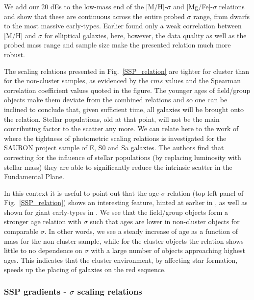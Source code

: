 \documentclass[useAMS,usenatbib]{mn2e}
\newcommand{\sig}{$\sigma$}
\begin{document}
We add our 20 dEs to the low-mass end of the [M/H]-{\sig} and [Mg/Fe]-{\sig} relations and show that these are continuous across the entire probed {\sig} range, from dwarfs to the most massive early-types. Earlier \cite{trager:2000} found only a weak correlation between [M/H] and {\sig} for elliptical galaxies, here, however, the data quality as well as the probed mass range and sample size make the presented relation much more robust.

The scaling relations presented in Fig.~\ref{SSP_relation} are tighter for cluster than for the non-cluster samples, as evidenced by the $rms$ values and the Spearman correlation coefficient values quoted in the figure. The younger ages of field/group objects make them deviate from the combined relations and so one can be inclined to conclude that, given sufficient time, all galaxies will be brought onto the relation. Stellar populations, old at that point, will not be the main contributing factor to the scatter any more. We can relate here to the work of \cite{falcon:2011b} where the tightness of photometric scaling relations is investigated for the SAURON project sample of E, S0 and Sa galaxies. The authors find that correcting for the influence of stellar populations (by replacing luminosity with stellar mass) they are able to significantly reduce the intrinsic scatter in the Fundamental Plane. 

In this context it is useful to point out that the age-{\sig} relation (top left panel of Fig.~\ref{SSP_relation}) shows an interesting feature, hinted at earlier in \cite{sanchezblazquez:2006a}, as well as shown for giant early-types in \cite{mcdermid:2015}. We see that the field/group objects form a stronger age relation with {\sig} such that ages are lower in non-cluster objects for comparable \sig. In other words, we see a steady increase of age as a function of mass for the non-cluster sample, while for the cluster objects the relation shows little to no dependence on {\sig} with a large number of objects approaching highest ages. This indicates that the cluster environment, by affecting star formation, speeds up the placing of galaxies on the red sequence.


\subsubsection{SSP gradients - $\sigma$ scaling relations}
\end{document}
